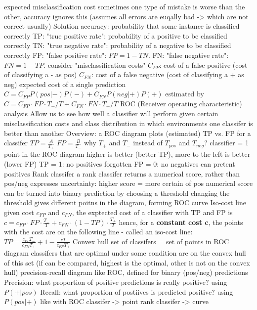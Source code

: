 \begin{outline}
    \1 expected misclassification cost
        \2 sometimes one type of mistake is worse than the other, accuracy ignores this (assumes all errors are euqally bad -> which are not correct usually)
        \2 Solution
            \3 accuracy: probability that some instance is classified correctly
            \3 TP: "true positive rate": probability of a positive to be classified correctly
            \3 TN: "true negative rate": probability of a negative to be classified correctly
            \3 FP: "false positive rate": $FP = 1 - TN$. 
            \3 FN: "false negative rate": $FN = 1 - TP$.
        \2 consider "misclassification costs"
            \3 $C_{FP}$: cost of a false positive (cost of classifying a - as pos)
            \3 $C_{FN}$: cost of a false negative (cost of classifying a + as neg)
        \2 expected cost of a single prediction
            \3 $C = C_{FP}P(pos|-)P(-) + C_{FN}P(neg|+)P(+)$
            \3 estimated by $C = C_{FP} \cdot FP \cdot T_{-}/T + C_{FN} \cdot FN \cdot T_{+}/T$
    \1 ROC (Receiver operating characteristic) analysis
        \2 Allow us to see
            \3 how well a classifier will perform given certain misclassification costs and class distribution
            \3 in which environments one classifer is better than another
        \2 Overview: a ROC diagram plots (estimated) TP vs. FP for a classifer
            \3 $TP = \frac{A}{T_{+}}$
            \3 $FP = \frac{B}{T_{-}}$
            \3 why $T_{+}$ and $T_{-}$ instead of $T_{pos}$ and $T_{neg}$?
         classifier = 1 point in the ROC diagram
            \3 higher is better (better TP), more to the left is better (lower FP)
            \3 TP = 1: no positives forgotten
            \3 FP = 0: no negatives can pretent positives
    \1 Rank classifer
        \2 a rank classifer returns a numerical score, rather than pos/neg
            \3 expresses uncertainty: higher score = more certain of pos
            \3 numerical score can be turned into binary prediction by choosing a threshold
            \3 changing the threshold gives different poitns in the diagram, forming ROC curve
    \1 Iso-cost line
        \2 given cost $c_{FP}$ and $c_{FN}$, the exptected cost of a classifier with TP and FP is $c = c_{FP} \cdot FP \cdot \frac{T_{-}}{T} + c_{FN} \cdot (1-TP) \cdot \frac{T_{+}}{T}$
        \2 hence, for a \textbf{constant cost c}, the points with the cost are on the following line - called an iso-cost line:
            \3 $TP = \frac{c_{FP}T_{-}}{c_{FN}T_{+}} + 1 - \frac{cT}{c_{FN}T_{+}}$
    \1 Convex hull
        \2 set of classifers = set of points in ROC diagram
        \2 classifers that are optimal under some condition are on the convex hull of this set (if can be compared, highest is the optimal, other is not on the convex hull)
    \1 precision-recall diagram
        \2 like ROC, defined for binary (pos/neg) predictions
            \3 Precision: what proportion of positive predictions is really positive? using $P(+|pos)$
            \3 Recall: what proportion of postiives is predicted positive? using $P(pos|+)$
        \2 like with ROC
            \3 classifer -> point
            \3 rank classifer -> curve
\end{outline}

